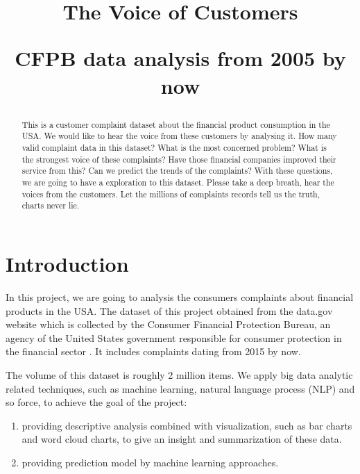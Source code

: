 \documentclass[conference]{IEEEtran}
\begin{document}
\title{The Voice of Customers  \\
\begin{large} 
  CFPB data analysis from 2005 by now
\end{large} 
}

\author{

}

\maketitle

\begin{abstract}
   This is a customer complaint dataset about the financial product consumption in the USA. We would like to hear the voice from these customers by analysing it. How many valid complaint data in this dataset? What is the most concerned problem? What is the strongest voice of these complaints? Have those financial companies improved their service from this? Can we predict the trends of the complaints?
   With these questions, we are going to have a exploration to this dataset. Please take a deep breath, hear the voices from the customers. Let the millions of complaints records tell us the truth, charts never lie.
\end{abstract}


\section{Introduction}
In this project, we are going to analysis the consumers complaints about financial products in the USA. The dataset of this project obtained from the data.gov website which is collected by the Consumer Financial Protection Bureau, an agency of the United States government responsible for consumer protection in the financial sector \cite{datasource}. It includes complaints dating from 2015 by now. 

The volume of this dataset is roughly 2 million items. We apply big data analytic related techniques, such as machine learning, natural language process (NLP) and so force, to achieve the goal of the project:

\begin{enumerate}[label=(\roman*)]
\item providing descriptive analysis combined with visualization, such as bar charts and word cloud charts, to give an insight and summarization of these data.
\item providing prediction model by machine learning approaches.
\end{enumerate}
\end{document}

